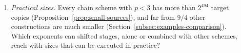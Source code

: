 \begin{enumerate}
\item \emph{Practical sizes.} Every chain scheme with \(p<3\) has more
than \(2^{494}\) target copies (Proposition~\ref{prop:small-sources}),
and far from \(9/4\) other constructions are much smaller
(Section~\ref{subsec:examples-comparison}). Which exponents can shifted
stages, alone or combined with other schemes, reach with sizes that can
be executed in practice?
\end{enumerate}
